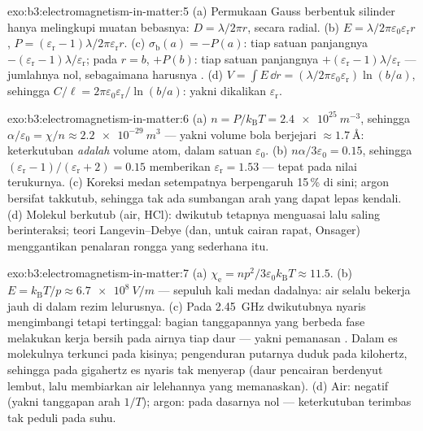 \begin{solution}{exo:b3:electromagnetism-in-matter:5}
(a) Permukaan Gauss berbentuk silinder hanya melingkupi muatan bebasnya:
$D = \lambda/2\pi r$, secara radial. (b) $E =
\lambda/2\pi\varepsilon_0\varepsilon_{\text{r}}r$, $P =
(\varepsilon_{\text{r}}-1)\lambda/2\pi\varepsilon_{\text{r}}r$.
(c) $\sigma_{\text{b}}(a) = -P(a)$: tiap satuan panjangnya
$-(\varepsilon_{\text{r}}-1)\lambda/\varepsilon_{\text{r}}$;
pada $r = b$, $+P(b)$: tiap satuan panjangnya
$+(\varepsilon_{\text{r}}-1)\lambda/\varepsilon_{\text{r}}$ ---
jumlahnya nol, sebagaimana harusnya . (d) $V = \int E\,\dd r =
(\lambda/2\pi\varepsilon_0\varepsilon_{\text{r}})\ln(b/a)$, sehingga
$C/\ell = 2\pi\varepsilon_0\varepsilon_{\text{r}}/\ln(b/a)$:
yakni dikalikan $\varepsilon_{\text{r}}$.
\end{solution}

\begin{solution}{exo:b3:electromagnetism-in-matter:6}
(a) $n = P/k_{\text{B}}T = \qty{2.4e25}{m^{-3}}$, sehingga
$\alpha/\varepsilon_0 = \chi/n \approx \qty{2.2e-29}{m^3}$ ---
yakni volume bola berjejari $\approx\qty{1.7}{\angstrom}$:
keterkutuban \emph{adalah} volume atom, dalam satuan $\varepsilon_0$.
(b) $n\alpha/3\varepsilon_0 = 0.15$, sehingga $(\varepsilon_{\text{r}} -
1)/(\varepsilon_{\text{r}} + 2) = 0.15$ memberikan
$\varepsilon_{\text{r}} = 1.53$ --- tepat pada nilai terukurnya.
(c) Koreksi medan setempatnya berpengaruh 15\,\% di sini; argon bersifat
takkutub, sehingga tak ada sumbangan arah yang dapat lepas kendali. (d)
Molekul berkutub (air, HCl): dwikutub tetapnya menguasai lalu
saling berinteraksi; teori Langevin--Debye (dan, untuk cairan rapat, Onsager)
menggantikan penalaran rongga yang sederhana itu.
\end{solution}

\begin{solution}{exo:b3:electromagnetism-in-matter:7}
(a) $\chi_{\text{e}} = np^2/3\varepsilon_0k_{\text{B}}T \approx
11.5$. (b) $E = k_{\text{B}}T/p \approx \qty{6.7e8}{V/m}$ ---
sepuluh kali medan dadalnya: air selalu bekerja jauh di dalam
rezim lelurusnya. (c) Pada \qty{2.45}{GHz} dwikutubnya nyaris mengimbangi
tetapi tertinggal: bagian tanggapannya yang berbeda fase melakukan kerja
bersih pada airnya tiap daur --- yakni pemanasan . Dalam es
molekulnya terkunci pada kisinya; pengenduran putarnya duduk pada
kilohertz, sehingga pada gigahertz es nyaris tak menyerap (daur pencairan
berdenyut lembut, lalu membiarkan air lelehannya yang memanaskan). (d) Air:
negatif (yakni tanggapan arah $1/T$); argon: pada dasarnya nol ---
keterkutuban terimbas tak peduli pada suhu.
\end{solution}

